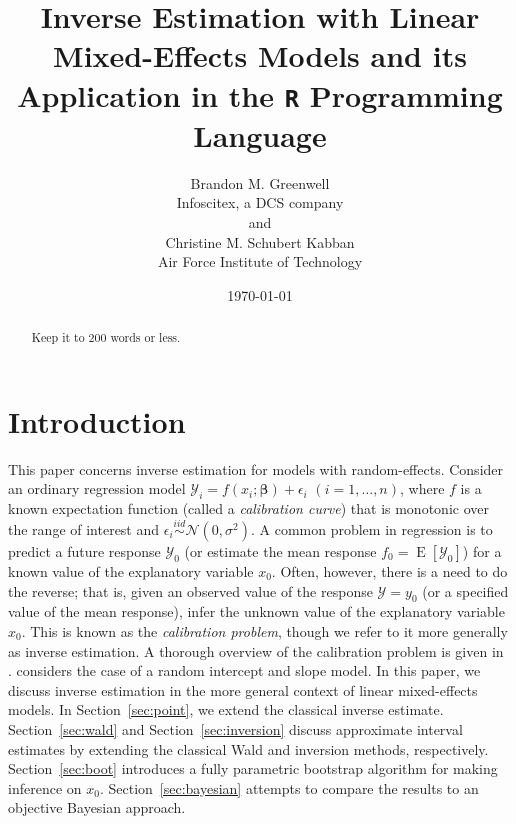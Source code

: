 \documentclass{article}\usepackage[]{graphicx}\usepackage[]{color}
\title{Inverse Estimation with Linear Mixed-Effects Models and its Application in the \texttt{R} Programming Language}
\author{Brandon M. Greenwell\\Infoscitex, a DCS company \\ and \\
        Christine M. Schubert Kabban\\Air Force Institute of Technology}
\date{\today}
\newcommand{\E}{\operatorname{E}}
\begin{document}
\maketitle





\begin{abstract}
Keep it to 200 words or less.
\end{abstract}



\section{Introduction}

This paper concerns inverse estimation for models with random-effects. Consider an ordinary regression model $\mathcal{Y}_i = f\left(x_i; \bm{\beta} \right) + \epsilon_i$ $(i = 1, \dotsc, n)$, where $f$ is a known expectation function (called a \emph{calibration curve}) that is monotonic over the range of interest and $\epsilon_i \stackrel{iid}{\sim} \mathcal{N}\left( 0, \sigma^2 \right)$.  A common problem in regression is to predict a future response $\mathcal{Y}_0$ (or estimate the mean response $f_0 = \E\left[\mathcal{Y}_0\right]$) for a known value of the explanatory variable $x_0$.  Often, however, there is a need to do the reverse; that is, given an observed value of the response $\mathcal{Y} = y_0$ (or a specified value of the mean response), infer the unknown value of the explanatory variable $x_0$.  This is known as the \emph{calibration problem}, though we refer to it more generally as inverse estimation.  A thorough overview of the calibration problem is given in \citet{osborne-statistical-1991}.  \citet{oman-calibration-1998} considers the case of a random intercept and slope model. In this paper, we discuss inverse estimation in the more general context of linear mixed-effects models. In Section~\ref{sec:point}, we extend the classical inverse estimate. Section~\ref{sec:wald} and Section~\ref{sec:inversion} discuss approximate interval estimates by extending the classical Wald and inversion methods, respectively. Section~\ref{sec:boot} introduces a fully parametric bootstrap algorithm for making inference on $x_0$. Section~\ref{sec:bayesian} attempts to compare the results to an objective Bayesian approach.
\end{document}
